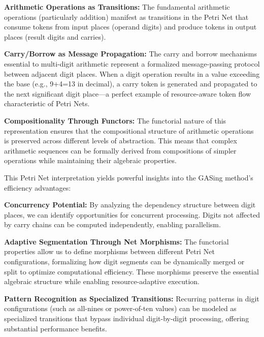 \noindent\textbf{\textbf{Arithmetic Operations as Transitions}:} The fundamental arithmetic operations (particularly addition) manifest as transitions in the Petri Net that consume tokens from input places (operand digits) and produce tokens in output places (result digits and carries).



\noindent\textbf{\textbf{Carry/Borrow as Message Propagation}:} The carry and borrow mechanisms essential to multi-digit arithmetic represent a formalized message-passing protocol between adjacent digit places. When a digit operation results in a value exceeding the base (e.g., 9+4=13 in decimal), a carry token is generated and propagated to the next significant digit place—a perfect example of resource-aware token flow characteristic of Petri Nets.



\noindent\textbf{\textbf{Compositionality Through Functors}:} The functorial nature of this representation ensures that the compositional structure of arithmetic operations is preserved across different levels of abstraction. This means that complex arithmetic sequences can be formally derived from compositions of simpler operations while maintaining their algebraic properties.


This Petri Net interpretation yields powerful insights into the GASing method's efficiency advantages:


\noindent\textbf{\textbf{Concurrency Potential}:} By analyzing the dependency structure between digit places, we can identify opportunities for concurrent processing. Digits not affected by carry chains can be computed independently, enabling parallelism.



\noindent\textbf{\textbf{Adaptive Segmentation Through Net Morphisms}:} The functorial properties allow us to define morphisms between different Petri Net configurations, formalizing how digit segments can be dynamically merged or split to optimize computational efficiency. These morphisms preserve the essential algebraic structure while enabling resource-adaptive execution.



\noindent\textbf{\textbf{Pattern Recognition as Specialized Transitions}:} Recurring patterns in digit configurations (such as all-nines or power-of-ten values) can be modeled as specialized transitions that bypass individual digit-by-digit processing, offering substantial performance benefits.


